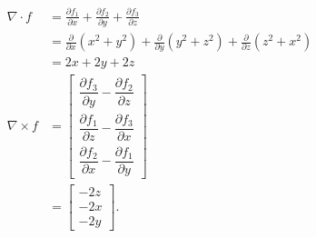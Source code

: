 \begin{align*}
 \nabla \cdot f &= \frac{\partial f_1}{\partial x} + \frac{\partial f_2}{\partial y} + \frac{\partial f_3}{\partial z} \\
 &= \frac{\partial}{\partial x}(x^2+y^2) + \frac{\partial}{\partial y}(y^2+z^2) + \frac{\partial}{\partial z}(z^2+x^2) \\
 &= 2x + 2y + 2z \\
 \nabla \times f &= \begin{bmatrix}
  \dfrac{\partial f_3}{\partial y} - \dfrac{\partial f_2}{\partial z} \\
  \dfrac{\partial f_1}{\partial z} - \dfrac{\partial f_3}{\partial x} \\
  \dfrac{\partial f_2}{\partial x} - \dfrac{\partial f_1}{\partial y}
 \end{bmatrix} \\
 &= \begin{bmatrix} - 2z \\ - 2x \\ - 2y \end{bmatrix}.
\end{align*}




\EEN
